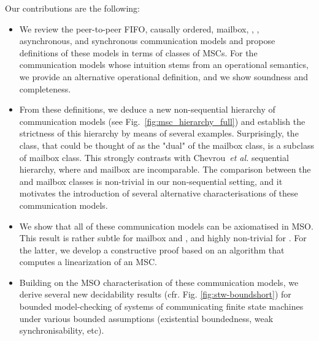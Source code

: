 
Our contributions are the following:
\begin{itemize}
	\item We review the peer-to-peer FIFO, causally ordered, mailbox, \onen, \nn, asynchronous, and synchronous communication models
	and propose definitions of these models in terms of classes of MSCs. For the communication models whose intuition stems from
	an operational semantics, we provide an alternative operational definition, and we show soundness and completeness.

	\item From these definitions, we deduce a new non-sequential hierarchy of communication models (see Fig.~\ref{fig:msc_hierarchy_full})
	and establish the strictness of this hierarchy by means of several examples.
	Surprisingly, the \onen class, that could be thought of as the "dual" of the mailbox class, is a subclass of mailbox class. This strongly
	contrasts with Chevrou~\emph{et al.} sequential hierarchy, where \onen and mailbox are incomparable. The comparison between
	the \onen and mailbox classes is non-trivial in our non-sequential setting, and it motivates the introduction
	of several  alternative characterisations of these communication models.

	\item We show that all of these communication models can be axiomatised in MSO. This result is rather subtle for mailbox and \onen, and highly non-trivial for \nn. For the latter, we develop a constructive proof based on an
	algorithm that computes a \nn linearization of an MSC.

	\item Building on the MSO characterisation of these communication models, we derive several new decidability results (cfr. Fig. \ref{fig:stw-boundshort}) for bounded
	model-checking of systems of communicating finite state machines under various bounded assumptions (existential boundedness, weak synchronisability, etc).
\end{itemize}



